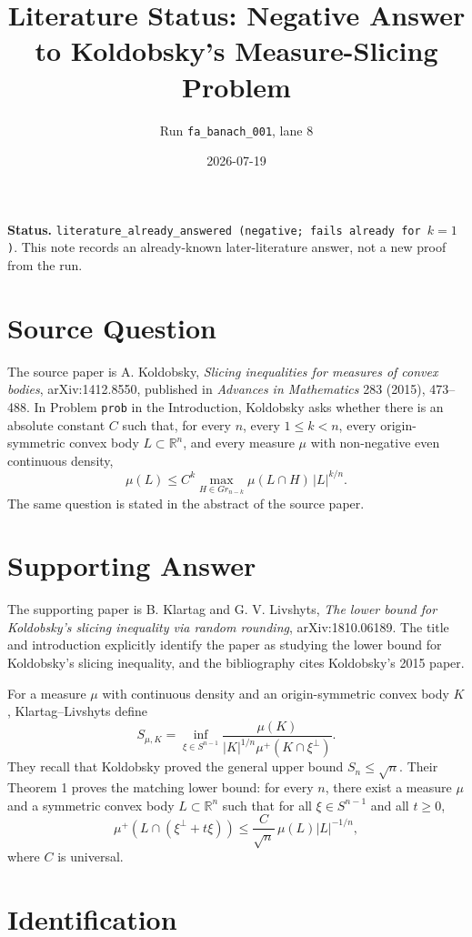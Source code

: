 \documentclass[11pt]{article}
\title{Literature Status: Negative Answer to Koldobsky's Measure-Slicing Problem}
\author{Run \texttt{fa\_banach\_001}, lane 8}
\date{2026-07-19}
\begin{document}
\maketitle

\noindent\textbf{Status.}
\texttt{literature\_already\_answered (negative; fails already for \(k=1\))}.
This note records an already-known later-literature answer, not a new proof
from the run.

\section*{Source Question}

The source paper is A. Koldobsky,
\emph{Slicing inequalities for measures of convex bodies}, arXiv:1412.8550,
published in \emph{Advances in Mathematics} 283 (2015), 473--488.
In Problem \texttt{prob} in the Introduction, Koldobsky asks whether there is
an absolute constant \(C\) such that, for every \(n\), every \(1\leq k<n\),
every origin-symmetric convex body \(L\subset\mathbb R^n\), and every measure
\(\mu\) with non-negative even continuous density,
\[
  \mu(L)
  \leq
  C^k
  \max_{H\in Gr_{n-k}} \mu(L\cap H)\, |L|^{k/n}.
\]
The same question is stated in the abstract of the source paper.

\section*{Supporting Answer}

The supporting paper is B. Klartag and G. V. Livshyts,
\emph{The lower bound for Koldobsky's slicing inequality via random rounding},
arXiv:1810.06189.
The title and introduction explicitly identify the paper as studying the
lower bound for Koldobsky's slicing inequality, and the bibliography cites
Koldobsky's 2015 paper.

For a measure \(\mu\) with continuous density and an origin-symmetric convex
body \(K\), Klartag--Livshyts define
\[
  S_{\mu,K}
  =
  \inf_{\xi\in S^{n-1}}
  \frac{\mu(K)}
       {|K|^{1/n}\mu^+(K\cap \xi^\perp)}.
\]
They recall that Koldobsky proved the general upper bound \(S_n\leq\sqrt n\).
Their Theorem 1 proves the matching lower bound: for every \(n\), there exist
a measure \(\mu\) and a symmetric convex body \(L\subset \mathbb R^n\) such
that for all \(\xi\in S^{n-1}\) and all \(t\geq 0\),
\[
  \mu^+(L\cap(\xi^\perp+t\xi))
  \leq
  \frac{C}{\sqrt n}\,\mu(L)|L|^{-1/n},
\]
where \(C\) is universal.

\section*{Identification}
\end{document}
